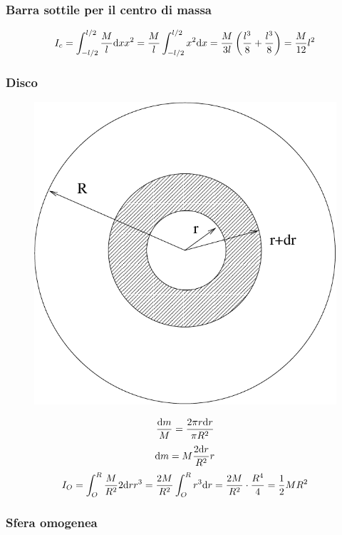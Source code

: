 \subsubsection{Barra sottile per il centro di massa}
\[I_c=\int_{-l/2}^{l/2}\frac{M}{l}\mathrm{d} x
  x^2=\frac{M}{l}\int_{-l/2}^{l/2}x^2 \mathrm{d}
  x=\frac{M}{3l}\left(\frac{l^3}{8}+\frac{l^3}{8}\right)=\frac{M}{12}l^2\]

\subsubsection{Disco}


\begin{figure}[htbp]
  \centering
  \includegraphics[scale=0.3]{immagini/fisica1/disco}
\end{figure}

\[\frac{\mathrm{d} m}{M}=\frac{2\pi r\mathrm{d} r}{\pi R^2}\]
\[\mathrm{d} m=M\frac{2\mathrm{d} r}{R^2}r\]
\[I_O=\int_O^R\frac{M}{R^2}2\mathrm{d} r r^3=\frac{2M}{R^2}\int_O^R r^3
  \mathrm{d} r=\frac{2M}{R^2}\cdot\frac{R^4}{4}=\frac{1}{2}MR^2\]

\subsubsection{Sfera omogenea}

